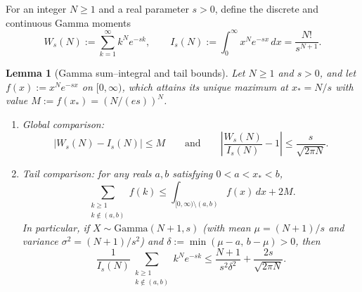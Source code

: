 \documentclass[11pt,a4paper]{article}
\newtheorem{lemma}[theorem]{Lemma}
\theoremstyle{remark}
\begin{document}
For an integer $N\ge 1$ and a real parameter $s>0$, define the discrete and continuous Gamma moments
\[
  W_s(N) := \sum_{k=1}^{\infty} k^N e^{-sk},
  \qquad
  I_s(N) := \int_0^{\infty} x^N e^{-sx}\,dx = \frac{N!}{s^{N+1}}.
\]

\begin{lemma}[Gamma sum--integral and tail bounds]\label{lem:gamma}
Let $N\ge 1$ and $s>0$, and let $f(x):=x^N e^{-sx}$ on $[0,\infty)$, which attains its unique maximum at $x_* = N/s$ with value $M := f(x_*) = (N/(es))^N$.
\begin{enumerate}
  \item[\textup{(a)}] Global comparison:
  \[
    |W_s(N) - I_s(N)| \le M
    \qquad\text{and}\qquad
    \left|\frac{W_s(N)}{I_s(N)} - 1\right| \le \frac{s}{\sqrt{2\pi N}}.
  \]
  \item[\textup{(b)}] Tail comparison: for any reals $a,b$ satisfying $0 < a < x_* < b$,
  \[
    \sum_{\substack{k\ge 1 \\ k\notin (a,b)}} f(k)
    \le \int_{[0,\infty)\setminus (a,b)} f(x)\,dx + 2M.
  \]
  In particular, if $X\sim\mathrm{Gamma}(N+1,s)$ (with mean $\mu=(N+1)/s$ and variance $\sigma^2=(N+1)/s^2$) and $\delta := \min(\mu-a,\, b-\mu) > 0$, then
  \[
    \frac{1}{I_s(N)}\sum_{\substack{k\ge 1 \\ k\notin (a,b)}} k^N e^{-sk}
    \le \frac{N+1}{s^2 \delta^2} + \frac{2s}{\sqrt{2\pi N}}.
  \]
\end{enumerate}
\end{lemma}
\end{document}
